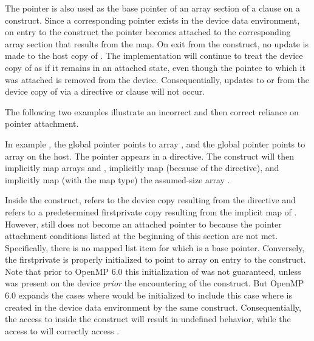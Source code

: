 The pointer  is also used as the base pointer of an array section of a
 clause on a  construct. Since a corresponding pointer
 exists in the device data environment, on entry to the construct the
pointer becomes attached to the corresponding array section that results from the
map. On exit from the construct, no update is made to the host copy of .
The implementation will continue to treat the device copy of  as if it
remains in an attached state, even though the pointee to which it was attached is
removed from the device. Consequentially, updates to or from the device copy of
 via a  directive or  clause will not
occur.



The following two examples illustrate an incorrect and then correct reliance on
pointer attachment.

In example , the global pointer  points to
array , and the global pointer  points to array  on
the host. The pointer  appears in a  directive.
The  construct will then implicitly map arrays  and
, implicitly map  (because of the 
directive), and implicitly map (with the  map type) the
assumed-size array .

Inside the  construct,  refers to the device copy
resulting from the  directive and  refers to a
predetermined firstprivate copy resulting from the implicit map of
. However,  still does not become an attached pointer to
 because the pointer attachment conditions listed at the beginning of
this section are not met. Specifically, there is no mapped list item for which
 is a base pointer. Conversely, the firstprivate  is
properly initialized to point to array  on entry to the 
construct. Note that prior to OpenMP 6.0 this initialization of  was
not guaranteed, unless  was present on the device \emph{prior} the
encountering of the  construct. But OpenMP 6.0 expands the cases
where  would be initialized to include this case where  is
created in the device data environment by the same construct. Consequentially,
the access to  inside the  construct will result in
undefined behavior, while the access to  will correctly access
.


